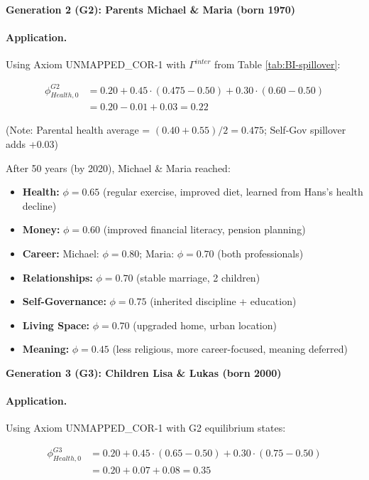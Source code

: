 \textbf{Generation 2 (G2): Parents Michael \& Maria (born 1970)}

\paragraph{Application.} Using Axiom UNMAPPED_COR-1 with $\Gamma^{inter}$ from Table \ref{tab:BI-spillover}:

\begin{align}
\phi^{G2}_{Health,0} &= 0.20 + 0.45 \cdot (0.475 - 0.50) + 0.30 \cdot (0.60 - 0.50) \\
&= 0.20 - 0.01 + 0.03 = 0.22
\end{align}

(Note: Parental health average = $(0.40 + 0.55)/2 = 0.475$; Self-Gov spillover adds +0.03)

After 50 years (by 2020), Michael \& Maria reached:
\begin{itemize}[nosep]
\item \textbf{Health:} $\phi = 0.65$ (regular exercise, improved diet, learned from Hans's health decline)
\item \textbf{Money:} $\phi = 0.60$ (improved financial literacy, pension planning)
\item \textbf{Career:} Michael: $\phi = 0.80$; Maria: $\phi = 0.70$ (both professionals)
\item \textbf{Relationships:} $\phi = 0.70$ (stable marriage, 2 children)
\item \textbf{Self-Governance:} $\phi = 0.75$ (inherited discipline + education)
\item \textbf{Living Space:} $\phi = 0.70$ (upgraded home, urban location)
\item \textbf{Meaning:} $\phi = 0.45$ (less religious, more career-focused, meaning deferred)
\end{itemize}

\textbf{Generation 3 (G3): Children Lisa \& Lukas (born 2000)}

\paragraph{Application.} Using Axiom UNMAPPED_COR-1 with G2 equilibrium states:

\begin{align}
\phi^{G3}_{Health,0} &= 0.20 + 0.45 \cdot (0.65 - 0.50) + 0.30 \cdot (0.75 - 0.50) \\
&= 0.20 + 0.07 + 0.08 = 0.35
\end{align}

